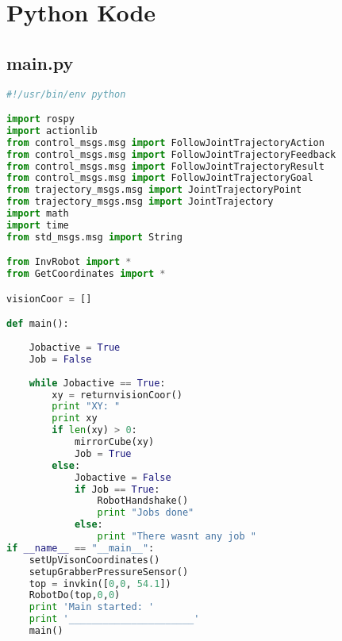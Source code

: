 \chapter{Python Kode}\label{app:PythonKode}
\section{main.py}\label{sec:Main}
\begin{lstlisting}[language=Python]
#!/usr/bin/env python

import rospy
import actionlib
from control_msgs.msg import FollowJointTrajectoryAction
from control_msgs.msg import FollowJointTrajectoryFeedback
from control_msgs.msg import FollowJointTrajectoryResult
from control_msgs.msg import FollowJointTrajectoryGoal
from trajectory_msgs.msg import JointTrajectoryPoint
from trajectory_msgs.msg import JointTrajectory
import math
import time
from std_msgs.msg import String

from InvRobot import *
from GetCoordinates import *

visionCoor = []

def main():
        
    Jobactive = True
    Job = False
    
    while Jobactive == True:
        xy = returnvisionCoor()
        print "XY: "
        print xy
        if len(xy) > 0:
            mirrorCube(xy)
            Job = True
        else:
            Jobactive = False
            if Job == True:
                RobotHandshake()
                print "Jobs done"
            else:
                print "There wasnt any job "                
if __name__ == "__main__":
    setUpVisonCoordinates()
    setupGrabberPressureSensor()
    top = invkin([0,0, 54.1])
    RobotDo(top,0,0)
    print 'Main started: '
    print '______________________'
    main()
\end{lstlisting}

\newpage

